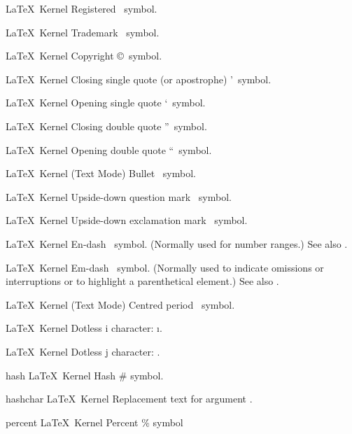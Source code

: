 %
 {}%
 {\LaTeX\ Kernel}%
 {Registered \textregistered\ symbol.}%
 {}

%
 {}%
 {\LaTeX\ Kernel}%
 {Trademark \texttrademark\ symbol.}%
 {}

%
 {}%
 {\LaTeX\ Kernel}%
 {Copyright \copyright\ symbol.}%
 {}

%
 {}%
 {\LaTeX\ Kernel}%
 {Closing single quote (or apostrophe) \textquoteright\ symbol.}%
 {}

%
 {}%
 {\LaTeX\ Kernel}%
 {Opening single quote \textquoteleft\ symbol.}%
 {}

%
 {}%
 {\LaTeX\ Kernel}%
 {Closing double quote \textquotedblright\ symbol.}%
 {}

%
 {}%
 {\LaTeX\ Kernel}%
 {Opening double quote \textquotedblleft\ symbol.}%
 {}

%
 {}%
 {\LaTeX\ Kernel (Text Mode)}%
 {Bullet \textbullet\ symbol.}%
 {}

%
 {}%
 {\LaTeX\ Kernel}%
 {Upside-down question mark \textquestiondown\ symbol.}%
 {}

%
 {}%
 {\LaTeX\ Kernel}%
 {Upside-down exclamation mark \textexclamdown\ symbol.}%
 {}

%
 {}%
 {\LaTeX\ Kernel}%
 {En-dash \textendash\ symbol. (Normally used for number ranges.)
  See also .}%
 {}

%
 {}%
 {\LaTeX\ Kernel}%
 {Em-dash \textemdash\ symbol. (Normally used to
  indicate omissions or interruptions or to highlight a parenthetical element.)
  See also .}%
 {}

%
 {}%
 {\LaTeX\ Kernel (Text Mode)}%
 {Centred period \textperiodcentered\ symbol.}%
 {}

%
 {}%
 {\LaTeX\ Kernel}%
 {Dotless i character: \i.}%
 {}

%
 {}%
 {\LaTeX\ Kernel}%
 {Dotless j character: \dotlessj.}%
 {}

 {hash}
 {\hashsym}
 {}
 {\LaTeX\ Kernel}
 {Hash \# symbol.}
 {}

 {hashchar}
 {\hashsym}
 {}
 {\LaTeX\ Kernel}
 {Replacement text for argument .}
 {}

 {percent}
 {\percentsym}
 {}
 {\LaTeX\ Kernel}
 {Percent \% symbol}
 {}

